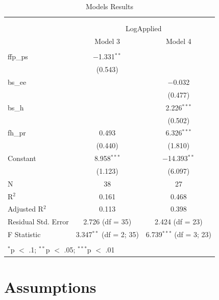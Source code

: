 \documentclass[]{elsarticle} %
\begin{document}
\begin{table}[!htbp] \centering 
  \caption{Models Results} 
  \label{} 
\begin{tabular}{@{\extracolsep{5pt}}lcc} 
\\[-1.8ex]\hline \\[-1.8ex] 
\\[-1.8ex] & \multicolumn{2}{c}{LogApplied} \\ 
 & Model 3 & Model 4 \\ 
\hline \\[-1.8ex] 
 ffp\_ps & $-$1.331$^{**}$ &  \\ 
  & (0.543) &  \\ 
  bs\_ee &  & $-$0.032 \\ 
  &  & (0.477) \\ 
  bs\_h &  & 2.226$^{***}$ \\ 
  &  & (0.502) \\ 
  fh\_pr & 0.493 & 6.326$^{***}$ \\ 
  & (0.440) & (1.810) \\ 
  Constant & 8.958$^{***}$ & $-$14.393$^{**}$ \\ 
  & (1.123) & (6.097) \\ 
 N & 38 & 27 \\ 
R$^{2}$ & 0.161 & 0.468 \\ 
Adjusted R$^{2}$ & 0.113 & 0.398 \\ 
Residual Std. Error & 2.726 (df = 35) & 2.424 (df = 23) \\ 
F Statistic & 3.347$^{**}$ (df = 2; 35) & 6.739$^{***}$ (df = 3; 23) \\ 
\hline \\[-1.8ex] 
\multicolumn{3}{l}{$^{*}$p $<$ .1; $^{**}$p $<$ .05; $^{***}$p $<$ .01} \\ 
\end{tabular} 
\end{table}

\section{Assumptions}\label{assumptions}
\end{document}
